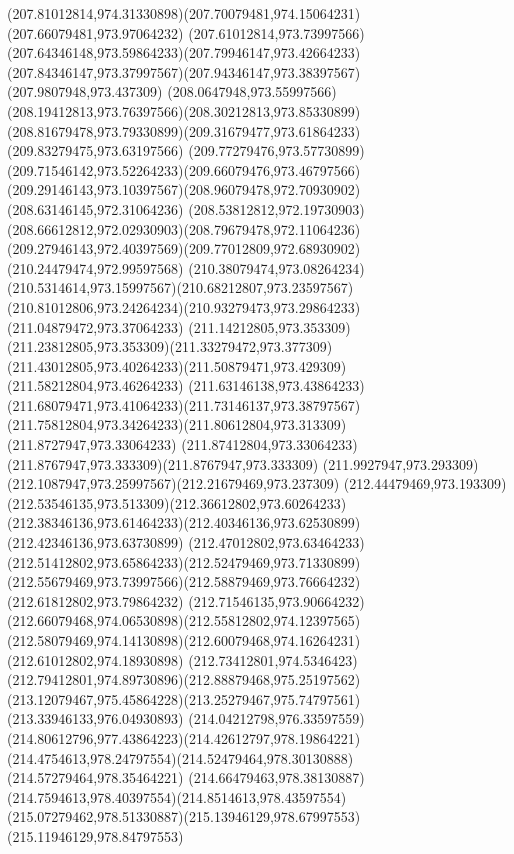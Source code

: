 {{		\curveto(207.81012814,974.31330898)(207.70079481,974.15064231)(207.66079481,973.97064232)
		\curveto(207.61012814,973.73997566)(207.64346148,973.59864233)(207.79946147,973.42664233)
		\curveto(207.84346147,973.37997567)(207.94346147,973.38397567)(207.9807948,973.437309)
		\curveto(208.0647948,973.55997566)(208.19412813,973.76397566)(208.30212813,973.85330899)
		\curveto(208.81679478,973.79330899)(209.31679477,973.61864233)(209.83279475,973.63197566)
		\curveto(209.77279476,973.57730899)(209.71546142,973.52264233)(209.66079476,973.46797566)
		\curveto(209.29146143,973.10397567)(208.96079478,972.70930902)(208.63146145,972.31064236)
		\curveto(208.53812812,972.19730903)(208.66612812,972.02930903)(208.79679478,972.11064236)
		\curveto(209.27946143,972.40397569)(209.77012809,972.68930902)(210.24479474,972.99597568)
		\curveto(210.38079474,973.08264234)(210.5314614,973.15997567)(210.68212807,973.23597567)
		\curveto(210.81012806,973.24264234)(210.93279473,973.29864233)(211.04879472,973.37064233)
		\curveto(211.14212805,973.353309)(211.23812805,973.353309)(211.33279472,973.377309)
		\curveto(211.43012805,973.40264233)(211.50879471,973.429309)(211.58212804,973.46264233)
		\curveto(211.63146138,973.43864233)(211.68079471,973.41064233)(211.73146137,973.38797567)
		\curveto(211.75812804,973.34264233)(211.80612804,973.313309)(211.8727947,973.33064233)
		\curveto(211.87412804,973.33064233)(211.8767947,973.333309)(211.8767947,973.333309)
		\curveto(211.9927947,973.293309)(212.1087947,973.25997567)(212.21679469,973.237309)
		\curveto(212.44479469,973.193309)(212.53546135,973.513309)(212.36612802,973.60264233)
		\curveto(212.38346136,973.61464233)(212.40346136,973.62530899)(212.42346136,973.63730899)
		\curveto(212.47012802,973.63464233)(212.51412802,973.65864233)(212.52479469,973.71330899)
		\curveto(212.55679469,973.73997566)(212.58879469,973.76664232)(212.61812802,973.79864232)
		\curveto(212.71546135,973.90664232)(212.66079468,974.06530898)(212.55812802,974.12397565)
		\curveto(212.58079469,974.14130898)(212.60079468,974.16264231)(212.61012802,974.18930898)
		\curveto(212.73412801,974.5346423)(212.79412801,974.89730896)(212.88879468,975.25197562)
		\curveto(213.12079467,975.45864228)(213.25279467,975.74797561)(213.33946133,976.04930893)
		\curveto(214.04212798,976.33597559)(214.80612796,977.43864223)(214.42612797,978.19864221)
		\curveto(214.4754613,978.24797554)(214.52479464,978.30130888)(214.57279464,978.35464221)
		\curveto(214.66479463,978.38130887)(214.7594613,978.40397554)(214.8514613,978.43597554)
		\curveto(215.07279462,978.51330887)(215.13946129,978.67997553)(215.11946129,978.84797553)
}}
